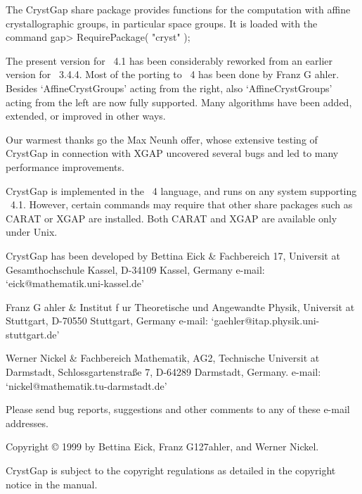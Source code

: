 
The CrystGap share package provides functions for the computation 
with affine crystallographic groups, in particular space groups.  
It is loaded with the command
\beginexample 
     gap> RequirePackage( "cryst" ); 
\endexample

The present version for {\GAP}~4.1 has been considerably reworked from
an earlier version for {\GAP}~3.4.4. Most of the porting to {\GAP}~4
has been done by Franz G{ a}hler. Besides `AffineCrystGroups'
acting from the right, also `AffineCrystGroups' acting from the left 
are now fully supported. Many algorithms have been added, extended, 
or improved in other ways.

Our warmest thanks go the Max Neunh{ o}ffer, whose extensive
testing of CrystGap in connection with XGAP uncovered several bugs and
led to many performance improvements.

CrystGap is implemented in the {\GAP}~4 language, and runs on any 
system supporting {\GAP}~4.1. However, certain commands may require 
that other share packages such as CARAT or XGAP are installed. 
Both CARAT and XGAP are available only under Unix.

CrystGap has been developed by
\beginitems
Bettina Eick &
Fachbereich 17,
Universit{ a}t Gesamthochschule Kassel,
D-34109 Kassel, Germany \hfill\break 
e-mail: `eick@mathematik.uni-kassel.de'

Franz G{ a}hler &
Institut f{ u}r Theoretische und Angewandte Physik,\hfil\break
Universit{ a}t Stuttgart,
D-70550 Stuttgart, Germany \hfill\break
e-mail: `gaehler@itap.physik.uni-stuttgart.de'

Werner Nickel &
Fachbereich Mathematik, AG2,
Technische Universit{ a}t Darmstadt, \hfill\break
Schlossgartenstra{\ss}e 7, D-64289 Darmstadt, Germany. \hfil\break
e-mail: `nickel@mathematik.tu-darmstadt.de'
\enditems

Please send bug reports, suggestions and other comments to any of these
e-mail addresses.

\vfill
Copyright {\copyright} 1999 
by Bettina Eick, Franz G\accent127ahler, and Werner Nickel.

\smallskip
CrystGap is subject to the {\GAP} copyright regulations as 
detailed in the copyright notice in the {\GAP} manual.






